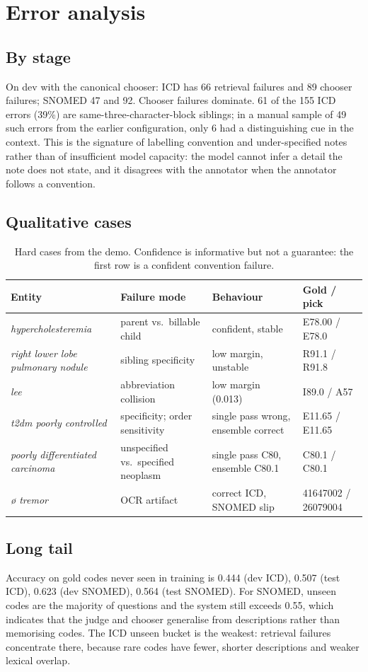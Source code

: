 \documentclass[11pt]{article}
\begin{document}
\section{Error analysis}
\subsection{By stage}
On dev with the canonical chooser: ICD has 66 retrieval failures and 89 chooser failures;
SNOMED 47 and 92. Chooser failures dominate. 61 of the 155 ICD errors (39\%) are
same-three-character-block siblings; in a manual sample of 49 such errors from the earlier
configuration, only 6 had a distinguishing cue in the context. This is the signature of
labelling convention and under-specified notes rather than of insufficient model capacity:
the model cannot infer a detail the note does not state, and it disagrees with the annotator
when the annotator follows a convention.

\subsection{Qualitative cases}
\begin{table}[H]
\centering
\footnotesize
\begin{tabularx}{\linewidth}{@{}llXl@{}}
\toprule
Entity & Failure mode & Behaviour & Gold / pick\\
\midrule
\emph{hypercholesteremia} & parent vs.\ billable child & confident, stable & E78.00 / E78.0\\
\emph{right lower lobe pulmonary nodule} & sibling specificity & low margin, unstable & R91.1 / R91.8\\
\emph{lee} & abbreviation collision & low margin (0.013) & I89.0 / A57\\
\emph{t2dm poorly controlled} & specificity; order sensitivity & single pass wrong, ensemble correct & E11.65 / E11.65\\
\emph{poorly differentiated carcinoma} & unspecified vs.\ specified neoplasm & single pass C80, ensemble C80.1 & C80.1 / C80.1\\
\emph{\o{} tremor} & OCR artifact & correct ICD, SNOMED slip & 41647002 / 26079004\\
\bottomrule
\end{tabularx}
\caption{Hard cases from the demo. Confidence is informative but not a guarantee:
the first row is a confident convention failure.}
\end{table}

\subsection{Long tail}
Accuracy on gold codes never seen in training is 0.444 (dev ICD), 0.507 (test ICD),
0.623 (dev SNOMED), 0.564 (test SNOMED). For SNOMED, unseen codes are the majority of
questions and the system still exceeds 0.55, which indicates that the judge and chooser
generalise from descriptions rather than memorising codes. The ICD unseen bucket is the
weakest: retrieval failures concentrate there, because rare codes have fewer, shorter
descriptions and weaker lexical overlap.
\end{document}
